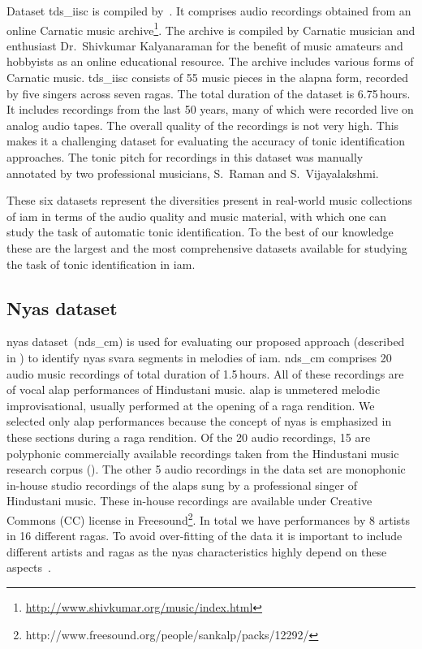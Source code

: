 {Dataset \acrshort{tds_iisc} is compiled by~\cite{ranjani2011carnatic}. It comprises audio recordings obtained from an online Carnatic music archive\footnote{\url{http://www.shivkumar.org/music/index.html}}. The archive is compiled by Carnatic musician and enthusiast Dr.~Shivkumar Kalyanaraman for the benefit of music amateurs and hobbyists as an online educational resource. The archive includes various forms of Carnatic music. \acrshort{tds_iisc} consists of 55 music pieces in the \gls{alapna} form, recorded by five singers across seven \glspl{raga}. The total duration of the dataset is 6.75\,hours. It includes recordings from the last 50 years, many of which were recorded live on analog audio tapes. The overall quality of the recordings is not very high. This makes it a challenging dataset for evaluating the accuracy of tonic identification approaches. The tonic pitch for recordings in this dataset was manually annotated by two professional musicians, S.~Raman and S.~Vijayalakshmi.


These six datasets represent the diversities present in real-world music collections of \gls{iam} in terms of the audio quality and music material, with which one can study the task of automatic tonic identification. To the best of our knowledge these are the largest and the most comprehensive datasets available for studying the task of tonic identification in \gls{iam}. 



\subsection{Nyas dataset}
\label{sec:corpus_nyas_dataset}

\Gls{nyas} dataset~(\acrshort{nds_cm}) is used for evaluating our proposed approach (described in ) to identify \gls{nyas} \gls{svara} segments in melodies of \gls{iam}. \acrshort{nds_cm} comprises 20 audio music recordings of total duration of 1.5\,hours. All of these recordings are of vocal \gls{alap} performances of Hindustani music. \Gls{alap} is unmetered melodic improvisational, usually performed at the opening of a \gls{raga} rendition. We selected only \gls{alap} performances because the concept of \gls{nyas} is emphasized in these sections during a \gls{raga} rendition. Of the 20 audio recordings, 15 are polyphonic commercially available recordings taken from the Hindustani music research corpus (). The other 5 audio recordings in the data set are monophonic in-house studio recordings of the \glspl{alap} sung by a professional singer of Hindustani music. These in-house recordings are available under Creative Commons (CC) license in Freesound\footnote{http://www.freesound.org/people/sankalp/packs/12292/}. In total we have performances by 8 artists in 16 different \glspl{raga}. To avoid over-fitting of the data it is important to include different artists and \glspl{raga} as the \gls{nyas} characteristics highly depend on these aspects~\cite{Dey2008}.

}
